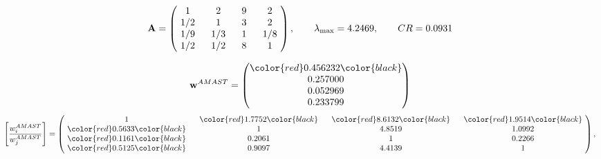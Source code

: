 \begin{example}
\begin{equation*}
\mathbf{A} =
\begin{pmatrix}
$\,\,$ 1 $\,\,$ & $\,\,$2$\,\,$ & $\,\,$9$\,\,$ & $\,\,$2 $\,\,$ \\
$\,\,$ 1/2$\,\,$ & $\,\,$ 1 $\,\,$ & $\,\,$3$\,\,$ & $\,\,$2 $\,\,$ \\
$\,\,$ 1/9$\,\,$ & $\,\,$ 1/3$\,\,$ & $\,\,$ 1 $\,\,$ & $\,\,$ 1/8 $\,\,$ \\
$\,\,$ 1/2$\,\,$ & $\,\,$ 1/2$\,\,$ & $\,\,$8$\,\,$ & $\,\,$ 1  $\,\,$ \\
\end{pmatrix},
\qquad
\lambda_{\max} =
4.2469,
\qquad
CR = 0.0931
\end{equation*}

\begin{equation*}
\mathbf{w}^{AMAST} =
\begin{pmatrix}
\color{red} 0.456232\color{black} \\
0.257000\\
0.052969\\
0.233799
\end{pmatrix}\end{equation*}
\begin{equation*}
\left[ \frac{{w}^{AMAST}_i}{{w}^{AMAST}_j} \right] =
\begin{pmatrix}
$\,\,$ 1 $\,\,$ & $\,\,$\color{red} 1.7752\color{black} $\,\,$ & $\,\,$\color{red} 8.6132\color{black} $\,\,$ & $\,\,$\color{red} 1.9514\color{black} $\,\,$ \\
$\,\,$\color{red} 0.5633\color{black} $\,\,$ & $\,\,$ 1 $\,\,$ & $\,\,$4.8519$\,\,$ & $\,\,$1.0992  $\,\,$ \\
$\,\,$\color{red} 0.1161\color{black} $\,\,$ & $\,\,$0.2061$\,\,$ & $\,\,$ 1 $\,\,$ & $\,\,$0.2266 $\,\,$ \\
$\,\,$\color{red} 0.5125\color{black} $\,\,$ & $\,\,$0.9097$\,\,$ & $\,\,$4.4139$\,\,$ & $\,\,$ 1  $\,\,$ \\
\end{pmatrix},
\end{equation*}


\end{example}
